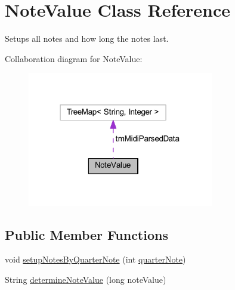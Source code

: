 \hypertarget{classcom_1_1lclion_1_1midiparser_1_1_note_value}{\section{Note\+Value Class Reference}
\label{classcom_1_1lclion_1_1midiparser_1_1_note_value}
}


Setups all notes and how long the notes last.  




Collaboration diagram for Note\+Value\+:\nopagebreak
\begin{figure}[H]
\begin{center}
\leavevmode
\includegraphics[width=231pt]{classcom_1_1lclion_1_1midiparser_1_1_note_value__coll__graph}
\end{center}
\end{figure}
\subsection*{Public Member Functions}
\begin{DoxyCompactItemize}
\item 
void \hyperlink{classcom_1_1lclion_1_1midiparser_1_1_note_value_a383ad3e4385be31e865bfe19f7d91050}{setup\+Notes\+By\+Quarter\+Note} (int \hyperlink{classcom_1_1lclion_1_1midiparser_1_1_note_value_ae639274224563b363fe8dc556cbbce62}{quarter\+Note})
\item 
String \hyperlink{classcom_1_1lclion_1_1midiparser_1_1_note_value_a92a1ecb736d0ecda2eea27d9181afac4}{determine\+Note\+Value} (long note\+Value)
\end{DoxyCompactItemize}
